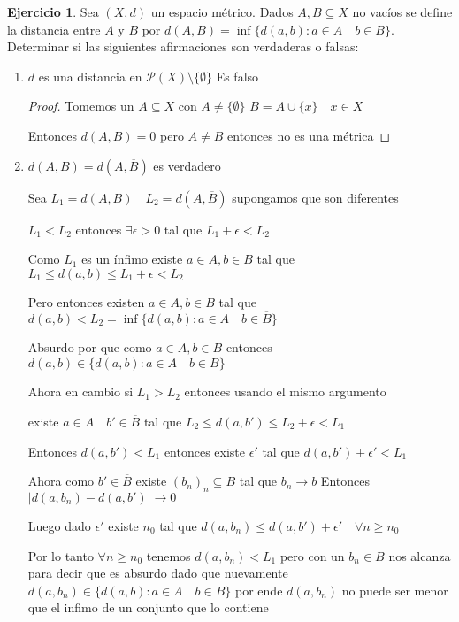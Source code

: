 \documentclass[12pt]{report}
\newcommand{\ra}{\rightarrow}
\newcommand{\ol}{\overline}
\theoremstyle{definition}
\newtheorem{ej}{Ejercicio}
\begin{document}
\begin{ej}
  Sea $(X,d)$ un espacio métrico. Dados $A,B \subseteq X$ no vacíos se define la distancia entre $A$ y $B$ por $d(A,B) = \inf{\{d(a,b): a\in A \quad b \in B\}}$. Determinar si las siguientes afirmaciones son verdaderas o falsas:
  \begin{enumerate}
    \item $d$ es una distancia en $\mathcal{P}(X) \setminus \{\emptyset\}$ Es falso
      \begin{proof}
	Tomemos un $A \subseteq X$ con $A \neq \{\emptyset\}$  $B = A \cup \{x\} \quad x \in X$ 

	Entonces $d(A,B) = 0$ pero $A \neq B$ entonces no es una métrica
	\end{proof}
    \item $d(A,B) = d(A ,\ol  B)$ es verdadero

      Sea $L_1 = d(A,B) \quad L_2 = d( A ,\ol B)$ supongamos que son diferentes

      $L_1 < L_2$ entonces $\exists \epsilon > 0$ tal que $L_1 + \epsilon < L_2$

      Como $L_1$ es un ínfimo existe $a \in A, b \in B$ tal que $L_1 \leq d(a,b) \leq L_1 + \epsilon <  L_2 $

      Pero entonces existen $a \in A , b \in B$ tal que  $d(a,b) <  L_2  = \inf{\{d(a,b): a\in A \quad b \in \ol B\}}$

      Absurdo por que como $a \in A, b\in B$ entonces $d(a,b) \in \{d(a,b): a\in A \quad b \in \ol B\}$

      Ahora en cambio si $L_1 > L_2$ entonces usando el mismo argumento

    existe $a \in A \quad b' \in \ol B$ tal que $L_2 \leq d(a,b') \leq L_2 + \epsilon <  L_1$

    Entonces $d(a,b') < L_1$ entonces existe $\epsilon '$ tal que $d(a,b') + \epsilon ' < L_1$

  Ahora como $b' \in \ol B$ existe $(b_n )_n \subseteq B$ tal que $b_n \ra b$ Entonces $|d(a,b_n) - d(a,b')| \ra 0$ 

  Luego dado $\epsilon '$ existe $n_0$ tal que $d(a,b_n) \leq d(a,b') + \epsilon ' \quad \forall n \geq n_0$

  Por lo tanto $\forall n \geq n_0$ tenemos $d(a,b_n) < L_1$ pero con un $b_n \in B$ nos alcanza para decir que es absurdo dado que nuevamente $d(a,b_n) \in \{d(a,b) : a \in A \quad b \in B\}$ por ende $d(a,b_n)$ no puede ser menor que el infimo de un conjunto que lo contiene


\end{enumerate}
\end{ej}
\end{document}
